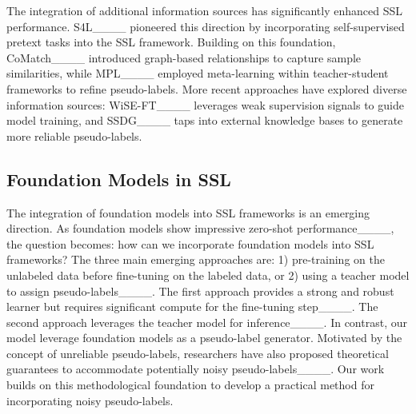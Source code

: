 The integration of additional information sources has significantly enhanced SSL performance. S4L____ pioneered this direction by incorporating self-supervised pretext tasks into the SSL framework. Building on this foundation, CoMatch____ introduced graph-based relationships to capture sample similarities, while MPL____ employed meta-learning within teacher-student frameworks to refine pseudo-labels. More recent approaches have explored diverse information sources: WiSE-FT____ leverages weak supervision signals to guide model training, and SSDG____ taps into external knowledge bases to generate more reliable pseudo-labels. 


\subsection{Foundation Models in SSL}
The integration of foundation models into SSL frameworks is an emerging direction. As foundation models show impressive zero-shot performance____, the question becomes: how can we incorporate foundation models into SSL frameworks? The three main emerging approaches are: 1) pre-training on the unlabeled data before fine-tuning on the labeled data, or 2) using a teacher model to assign pseudo-labels____. The first approach provides a strong and robust learner but requires significant compute for the fine-tuning step____. The second approach leverages the teacher model for inference____. In contrast, our model leverage foundation models as a pseudo-label generator. Motivated by the concept of unreliable pseudo-labels, researchers have also proposed theoretical guarantees to accommodate potentially noisy pseudo-labels____. Our work builds on this methodological foundation to develop a practical method for incorporating noisy pseudo-labels.

